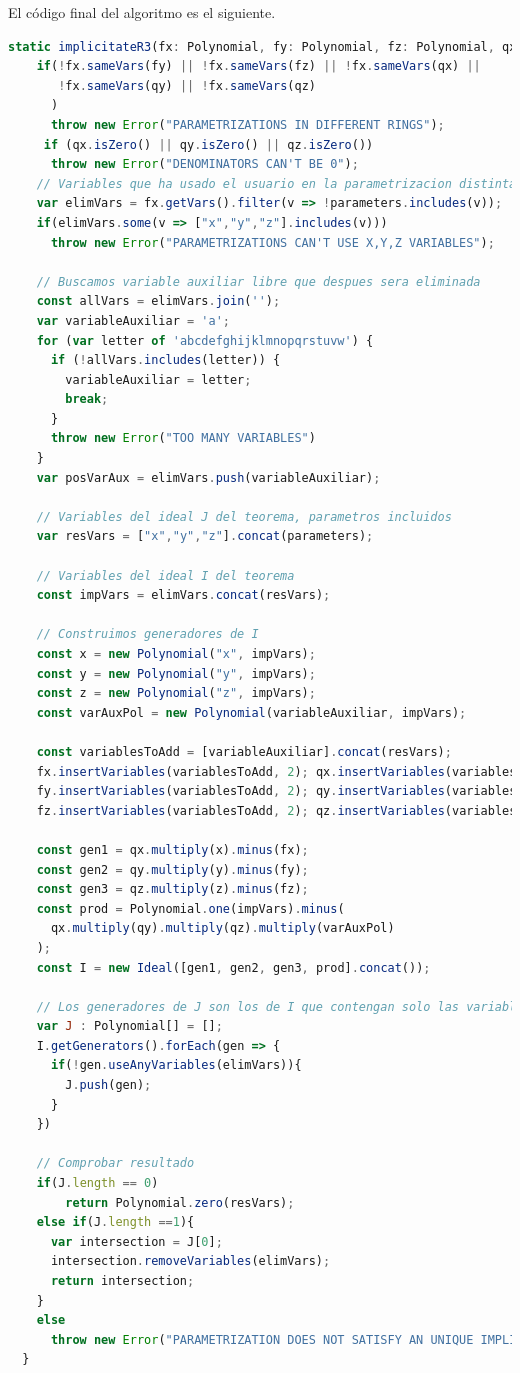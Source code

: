 El código final del algoritmo es el siguiente.
\begin{lstlisting}[language=JavaScript, caption=Algoritmo de implicitación]
static implicitateR3(fx: Polynomial, fy: Polynomial, fz: Polynomial, qx: Polynomial, qy: Polynomial, qz: Polynomial, parameters: string[] = []){
    if(!fx.sameVars(fy) || !fx.sameVars(fz) || !fx.sameVars(qx) || 
       !fx.sameVars(qy) || !fx.sameVars(qz)
      )
      throw new Error("PARAMETRIZATIONS IN DIFFERENT RINGS");
     if (qx.isZero() || qy.isZero() || qz.isZero())
      throw new Error("DENOMINATORS CAN'T BE 0");
    // Variables que ha usado el usuario en la parametrizacion distintas a x,y,z
    var elimVars = fx.getVars().filter(v => !parameters.includes(v));
    if(elimVars.some(v => ["x","y","z"].includes(v)))
      throw new Error("PARAMETRIZATIONS CAN'T USE X,Y,Z VARIABLES");

    // Buscamos variable auxiliar libre que despues sera eliminada
    const allVars = elimVars.join('');
    var variableAuxiliar = 'a';
    for (var letter of 'abcdefghijklmnopqrstuvw') {
      if (!allVars.includes(letter)) {
        variableAuxiliar = letter;
        break;
      }
      throw new Error("TOO MANY VARIABLES")
    }
    var posVarAux = elimVars.push(variableAuxiliar);
   
    // Variables del ideal J del teorema, parametros incluidos
    var resVars = ["x","y","z"].concat(parameters);

    // Variables del ideal I del teorema
    const impVars = elimVars.concat(resVars);

    // Construimos generadores de I
    const x = new Polynomial("x", impVars);
    const y = new Polynomial("y", impVars);
    const z = new Polynomial("z", impVars);
    const varAuxPol = new Polynomial(variableAuxiliar, impVars);

    const variablesToAdd = [variableAuxiliar].concat(resVars);
    fx.insertVariables(variablesToAdd, 2); qx.insertVariables(variablesToAdd, 2);
    fy.insertVariables(variablesToAdd, 2); qy.insertVariables(variablesToAdd, 2);
    fz.insertVariables(variablesToAdd, 2); qz.insertVariables(variablesToAdd, 2);
    
    const gen1 = qx.multiply(x).minus(fx);
    const gen2 = qy.multiply(y).minus(fy);
    const gen3 = qz.multiply(z).minus(fz);
    const prod = Polynomial.one(impVars).minus(
      qx.multiply(qy).multiply(qz).multiply(varAuxPol)
    );
    const I = new Ideal([gen1, gen2, gen3, prod].concat());

    // Los generadores de J son los de I que contengan solo las variables de resVars
    var J : Polynomial[] = [];
    I.getGenerators().forEach(gen => {
      if(!gen.useAnyVariables(elimVars)){
        J.push(gen);
      }
    })

    // Comprobar resultado
    if(J.length == 0)   
        return Polynomial.zero(resVars);
    else if(J.length ==1){
      var intersection = J[0];
      intersection.removeVariables(elimVars);
      return intersection;
    }
    else
      throw new Error("PARAMETRIZATION DOES NOT SATISFY AN UNIQUE IMPLICIT EQUATION");
  }
\end{lstlisting}


